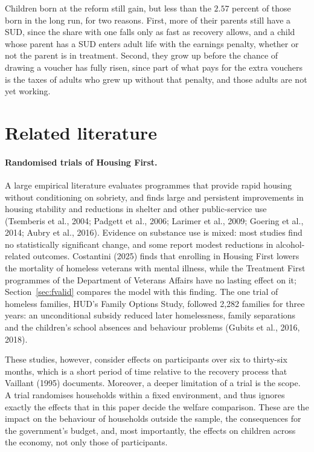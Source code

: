 \documentclass[10pt]{article}
\newif\ifshowupdates \showupdatesfalse
\newcommand{\updnum}[1]{\ifshowupdates{\color{blue}#1}\else#1\fi}
\begin{document}
Children born at the reform still gain, but less than the \updnum{$2.57$} percent of those born in the long run, for two reasons. First, more of their parents still have a SUD, since the share with one falls only as fast as recovery allows, and a child whose parent has a SUD enters adult life with the earnings penalty, whether or not the parent is in treatment. Second, they grow up before the chance of drawing a voucher has fully risen, since part of what pays for the extra vouchers is the taxes of adults who grew up without that penalty, and those adults are not yet working. 


\section{Related literature}\label{sec:literature}

\paragraph{Randomised trials of Housing First.} A large empirical literature
evaluates programmes that provide rapid housing without conditioning on sobriety,
and finds large and persistent improvements in housing stability and reductions in
shelter and other public-service use (Tsemberis et al., 2004; Padgett et al., 2006; Larimer et al., 2009; Goering et al., 2014; Aubry et
al., 2016). Evidence on substance use is mixed: most studies find no statistically
significant change, and some report modest reductions in alcohol-related outcomes. Costantini (2025) finds that enrolling in Housing First lowers the mortality of homeless veterans with mental illness, while the Treatment First programmes of the Department of Veterans Affairs have no lasting effect on it; Section~\ref{sec:fvalid} compares the model with this finding. The one trial of homeless families, HUD's Family Options Study, followed 2,282 families for three years: an unconditional subsidy reduced later homelessness, family separations and the children's school absences and behaviour problems (Gubits et al., 2016, 2018).

 These studies, however, consider effects on participants over six to thirty-six months, which is a short period of time relative to the recovery process that Vaillant (1995) documents.  Moreover, a deeper limitation of a trial is the scope. A trial randomises households within a fixed environment, and thus ignores exactly the effects that in this paper decide the welfare comparison. These are the impact on the behaviour of households outside the sample, the consequences for the government's budget, and, most importantly, the effects on children across the economy, not only those of participants.
\end{document}
